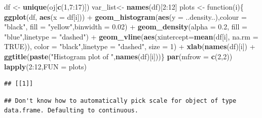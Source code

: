 \documentclass[]{article}
\newenvironment{Shaded}{\begin{snugshade}}{\end{snugshade}}
\newcommand{\KeywordTok}[1]{\textcolor[rgb]{0.13,0.29,0.53}{\textbf{{#1}}}}
\newcommand{\DataTypeTok}[1]{\textcolor[rgb]{0.13,0.29,0.53}{{#1}}}
\newcommand{\DecValTok}[1]{\textcolor[rgb]{0.00,0.00,0.81}{{#1}}}
\newcommand{\FloatTok}[1]{\textcolor[rgb]{0.00,0.00,0.81}{{#1}}}
\newcommand{\StringTok}[1]{\textcolor[rgb]{0.31,0.60,0.02}{{#1}}}
\newcommand{\OtherTok}[1]{\textcolor[rgb]{0.56,0.35,0.01}{{#1}}}
\newcommand{\NormalTok}[1]{{#1}}
\begin{document}
\begin{Shaded}
\begin{Highlighting}[]
\NormalTok{df <-}\StringTok{ }\KeywordTok{unique}\NormalTok{(oj[}\KeywordTok{c}\NormalTok{(}\DecValTok{1}\NormalTok{,}\DecValTok{7}\NormalTok{:}\DecValTok{17}\NormalTok{)]) }
\NormalTok{var_list<-}\StringTok{ }\KeywordTok{names}\NormalTok{(df)[}\DecValTok{2}\NormalTok{:}\DecValTok{12}\NormalTok{]}
\NormalTok{plots <-}\StringTok{ }\NormalTok{function(i)\{}
                     \KeywordTok{ggplot}\NormalTok{(df, }\KeywordTok{aes}\NormalTok{(}\DataTypeTok{x =} \NormalTok{df[i])) +}\StringTok{ }
\StringTok{                     }\KeywordTok{geom_histogram}\NormalTok{(}\KeywordTok{aes}\NormalTok{(}\DataTypeTok{y =} \NormalTok{..density..),}\DataTypeTok{colour =} \StringTok{"black"}\NormalTok{, }
                                    \DataTypeTok{fill =} \StringTok{"yellow"}\NormalTok{,}\DataTypeTok{binwidth =} \FloatTok{0.02}\NormalTok{) +}
\StringTok{                     }\KeywordTok{geom_density}\NormalTok{(}\DataTypeTok{alpha =} \FloatTok{0.2}\NormalTok{, }\DataTypeTok{fill =} \StringTok{"blue"}\NormalTok{,}\DataTypeTok{linetype =} \StringTok{"dashed"}\NormalTok{) +}\StringTok{ }
\StringTok{                     }\KeywordTok{geom_vline}\NormalTok{(}\KeywordTok{aes}\NormalTok{(}\DataTypeTok{xintercept=}\KeywordTok{mean}\NormalTok{(df[i], }\DataTypeTok{na.rm =} \OtherTok{TRUE}\NormalTok{)),}
                                \DataTypeTok{color =} \StringTok{"black"}\NormalTok{,}\DataTypeTok{linetype =} \StringTok{"dashed"}\NormalTok{, }\DataTypeTok{size =} \DecValTok{1}\NormalTok{) +}
\StringTok{                     }\KeywordTok{xlab}\NormalTok{(}\KeywordTok{names}\NormalTok{(df)[i]) +}
\StringTok{                     }\KeywordTok{ggtitle}\NormalTok{(}\KeywordTok{paste}\NormalTok{(}\StringTok{"Histogram plot of "}\NormalTok{,}\KeywordTok{names}\NormalTok{(df)[i]))\}}
\KeywordTok{par}\NormalTok{(}\DataTypeTok{mfrow =} \KeywordTok{c}\NormalTok{(}\DecValTok{2}\NormalTok{,}\DecValTok{2}\NormalTok{))}
\KeywordTok{lapply}\NormalTok{(}\DecValTok{2}\NormalTok{:}\DecValTok{12}\NormalTok{,}\DataTypeTok{FUN =} \NormalTok{plots)}
\end{Highlighting}
\end{Shaded}

\begin{verbatim}
## [[1]]
\end{verbatim}

\begin{verbatim}
## Don't know how to automatically pick scale for object of type data.frame. Defaulting to continuous.
\end{verbatim}
\end{document}
